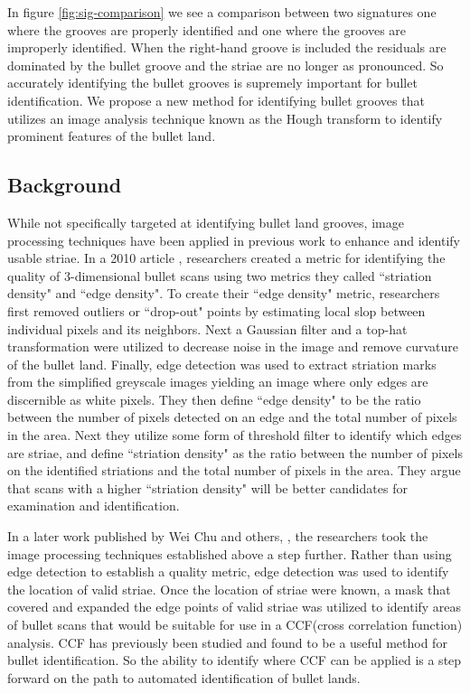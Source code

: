 \documentclass[12pt]{article}\usepackage[]{graphicx}\usepackage[]{color}
\theoremstyle{nonumberplain}
\begin{document}
In figure \ref{fig:sig-comparison} we see a comparison between two signatures one where the grooves are properly identified and one where the grooves are improperly identified. When the right-hand groove is included the residuals are dominated by the bullet groove and the striae are no longer as pronounced. So accurately identifying the bullet grooves is supremely important for bullet identification. We propose a new method for identifying bullet grooves that utilizes an image analysis technique known as the Hough transform to identify prominent features of the bullet land. 

\subsection{Background}

While not specifically targeted at identifying bullet land grooves, image processing techniques have been applied in previous work to enhance and identify usable striae. In a 2010 article \cite{chu2010}, researchers created a metric for identifying the quality of 3-dimensional bullet scans using two metrics they called ``striation density" and ``edge density". To create their ``edge density" metric, researchers first removed outliers or ``drop-out" points by estimating local slop between individual pixels and its neighbors. Next a Gaussian filter and a top-hat transformation were utilized to decrease noise in the image and remove curvature of the bullet land. Finally, edge detection was used to extract striation marks from the simplified greyscale images yielding an image where only edges are discernible as white pixels. They then define ``edge density" to be the ratio between the number of pixels detected on an edge and the total number of pixels in the area. Next they utilize some form of threshold filter to identify which edges are striae, and define ``striation density" as the ratio between the number of pixels on the identified striations and the total number of pixels in the area. They argue that scans with a higher ``striation density" will be better candidates for examination and identification. 

In a later work published by Wei Chu and others, \cite{chu2013}, the researchers took the image processing techniques established above a step further. Rather than using edge detection to establish a quality metric, edge detection was used to identify the location of valid striae. Once the location of striae were known, a mask that covered and expanded the edge points of valid striae was utilized to identify areas of bullet scans that would be suitable for use in a CCF(cross correlation function) analysis. CCF has previously been studied \cite{chu2010-ccf} and found to be a useful method for bullet identification. So the ability to identify where CCF can be applied is a step forward on the path to automated identification of bullet lands.
\end{document}
